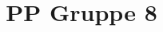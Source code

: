 \documentclass[compress,11pt]{beamer}
\title{PP Gruppe 8}
\begin{document}
\frame[c]{\titlepage}
\begin{frame}
\tableofcontents
\end{frame}






\end{document}

